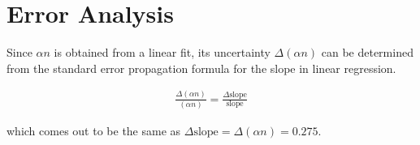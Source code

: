 \section{Error Analysis}
Since $\alpha n$ is obtained from a linear fit, its uncertainty
$\Delta (\alpha n)$ can be determined from the standard error propagation formula for the slope in linear regression.

\begin{align*}
    \frac{\Delta (\alpha n)}{ (\alpha n)} = \frac{\Delta \text{slope}}{\text{slope}}
\end{align*}

which comes out to be the same as $\Delta \text{slope} = \Delta (\alpha n) = 0.275$.